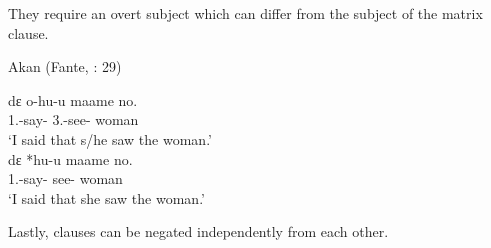 \documentclass[output=paper]{langscibook}
\begin{document}
\begin{exe}
\begin{xlist}



\end{xlist}
\end{exe}

They require an overt subject which can differ from the subject of the matrix clause.

\begin{exe}
\ex \label{Paj12} Akan (Fante, \citealt{osam1998}: 29)
\begin{xlist}

\ex \label{Paj12a} 
 {d{ɛ}} {o-hu-u} {maame} {no.} \\
    1{\sg}.{\subj}-say-{\compl} {\comp} 3{\sg}.{\subj}-see-{\compl} woman \\
\glt `I said that s/he saw the woman.’\\

\ex \label{Paj12b}
 {d{ɛ}} *{hu-u} {maame} {no.} \\
    1{\sg}.{\subj}-say-{\compl} {\comp} see-{\compl} woman \\
\glt `I said that she saw the woman.’

\end{xlist}
\end{exe}
 

Lastly, clauses can be negated independently from each other. 
\end{document}
